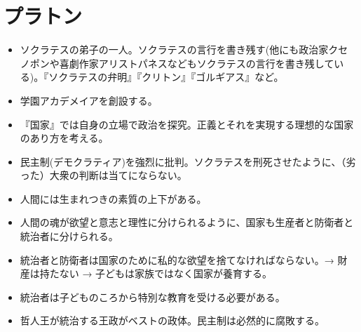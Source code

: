 \documentclass[uplatex,dvipdfmx]{jsarticle} \usepackage{mystyle}%
\begin{document}
\section{プラトン}

\begin{itemize}
\item ソクラテスの弟子の一人。ソクラテスの言行を書き残す(他にも政治家クセノポンや喜劇作家アリストパネスなどもソクラテスの言行を書き残している)。『ソクラテスの弁明』『クリトン』『ゴルギアス』など。
\item 学園アカデメイアを創設する。
\item 『国家』では自身の立場で政治を探究。正義とそれを実現する理想的な国家のあり方を考える。
\item 民主制(デモクラティア)を強烈に批判。ソクラテスを刑死させたように、（劣った）大衆の判断は当てにならない。
\item 人間には生まれつきの素質の上下がある。
\item 人間の魂が欲望と意志と理性に分けられるように、国家も生産者と防衛者と統治者に分けられる。
\item 統治者と防衛者は国家のために私的な欲望を捨てなければならない。→ 財産は持たない → 子どもは家族ではなく国家が養育する。
\item 統治者は子どものころから特別な教育を受ける必要がある。
\item 哲人王が統治する王政がベストの政体。民主制は必然的に腐敗する。
\end{itemize}
\end{document}
